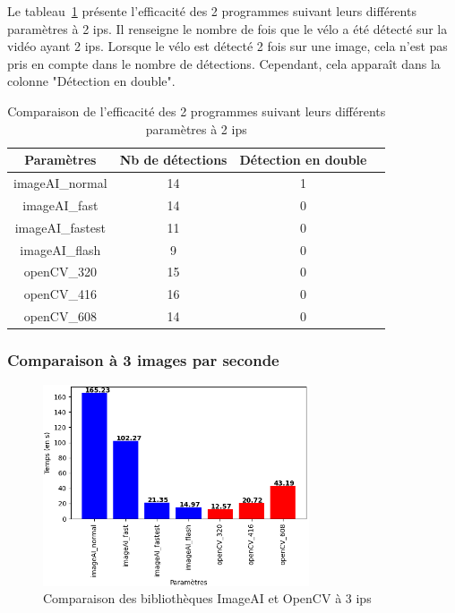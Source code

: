 Le tableau~\ref{tab_2fps} présente l'efficacité des 2 programmes suivant leurs différents paramètres à 2 ips.
Il renseigne le nombre de fois que le vélo a été détecté sur la vidéo ayant 2 ips.
Lorsque le vélo est détecté 2 fois sur une image, cela n'est pas pris en compte dans le nombre de détections.
Cependant, cela apparaît dans la colonne "Détection en double".

\begin{table}[H]
    \centering
    \begin{tabular}{|c|c|c|c|}
        \hline
        \rowcolor{tableColorDark} Paramètres & Nb de détections & Détection en double \\
        \hline

        imageAI\_normal                      & 14               & 1                   \\\hline
        imageAI\_fast                        & 14               & 0                   \\\hline
        imageAI\_fastest                     & 11               & 0                   \\\hline
        imageAI\_flash                       & 9                & 0                   \\\hline
        openCV\_320                          & 15               & 0                   \\\hline
        openCV\_416                          & 16               & 0                   \\\hline
        openCV\_608                          & 14               & 0                   \\\hline
    \end{tabular}
    \caption{Comparaison de l'efficacité des 2 programmes suivant leurs différents paramètres à 2 ips}
    \label{tab_2fps}
\end{table}

\subsubsection{Comparaison à 3 images par seconde}
\label{sec:comparaisonIA:resultats:3fps}

\begin{figure}[H]
    \centering
    \includegraphics[width=0.7\textwidth]{img/result_3fps.png}
    \caption{Comparaison des bibliothèques ImageAI et OpenCV à 3 ips}
\end{figure}


